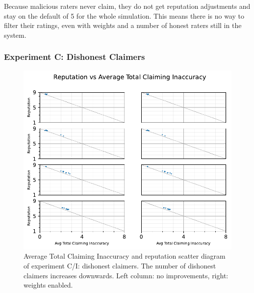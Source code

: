 \documentclass[%
    ]{\PathToTumTemplate/thesis/tum_thesis}
\begin{document}
Because malicious raters never claim, they do not get reputation adjustments and stay on the default of 5 for the whole simulation.
This means there is no way to filter their ratings, even with weights and a number of honest raters still in the system.

\subsubsection{Experiment C: Dishonest Claimers}

\begin{figure}[tbp]
  \begin{center}
        \includegraphics[width=0.75\linewidth]	{../results/c/AvgTotClaimInaccuracyAndReputationScatter_joined.pdf}
    \caption{
    Average Total Claiming Inaccuracy and reputation scatter diagram of experiment C/I: dishonest claimers.
    The number of dishonest claimers increases downwards.
    Left column: no improvements, right: weights enabled.
    }
    \label{fig:res_c_scatter}
  \end{center}
\end{figure}
\end{document}

